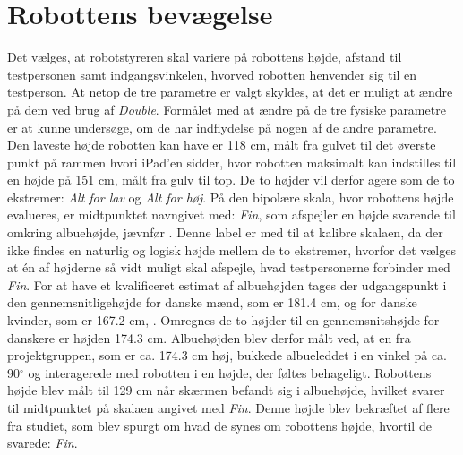 \section{Robottens bevægelse}
\label{RobottensBevaegelse}
%
Det vælges, at robotstyreren skal variere på robottens højde, afstand til testpersonen samt indgangsvinkelen, hvorved robotten henvender sig til en testperson. At netop de tre parametre er valgt skyldes, at det er muligt at ændre på dem ved brug af \textit{Double}. Formålet med at ændre på de tre fysiske parametre er at kunne undersøge, om de har indflydelse på nogen af de andre parametre.\blankline
%
Den laveste højde robotten kan have er 118 cm, målt fra gulvet til det øverste punkt på rammen hvori iPad'en sidder, hvor robotten maksimalt kan indstilles til en højde på 151 cm, målt fra gulv til top. De to højder vil derfor agere som de to ekstremer: \textit{Alt for lav} og \textit{Alt for høj}. På den bipolære skala, hvor robottens højde evalueres, er midtpunktet navngivet med: \textit{Fin}, som afspejler en højde svarende til omkring albuehøjde, jævnfør . Denne label er med til at kalibre skalaen, da der ikke findes en naturlig og logisk højde mellem de to ekstremer, hvorfor det vælges at én af højderne så vidt muligt skal afspejle, hvad testpersonerne forbinder med \textit{Fin}. For at have et kvalificeret estimat af albuehøjden tages der udgangspunkt i den gennemsnitligehøjde for danske mænd, som er 181.4 cm, og for danske kvinder, som er 167.2 cm, \parencite{WEB:DanskersHoejde}. Omregnes de to højder til en gennemsnitshøjde for danskere er højden 174.3 cm. Albuehøjden blev derfor målt ved, at en fra projektgruppen, som er ca. 174.3 cm høj, bukkede albueleddet i en vinkel på ca. 90$^\circ$ og interagerede med robotten i en højde, der føltes behageligt. Robottens højde blev målt til 129 cm når skærmen befandt sig i albuehøjde, hvilket svarer til midtpunktet på skalaen angivet med \textit{Fin}. Denne højde blev bekræftet af flere fra studiet, som blev spurgt om hvad de synes om robottens højde, hvortil de svarede: \textit{Fin}. 

